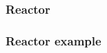% 
% 
% 
% 
% 
\begin{frame}[fragile]
    \frametitle{Reactor}
\end{frame}
% 
% 
% 
% 
\begin{frame}[fragile]
    \frametitle{Reactor example}
\end{frame}
